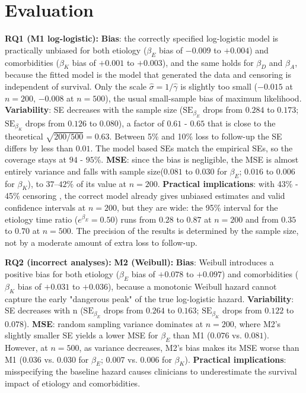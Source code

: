\documentclass[10pt,a4paper]{article}
\begin{document}
\section{Evaluation}
\textbf{RQ1 (M1 log-logistic):}
\textbf{Bias}: the correctly specified log-logistic model is practically unbiased for both etiology ($\beta_E$ bias of $-0.009$ to $+0.004$) and comorbidities ($\beta_K$ bias of $+0.001$ to $+0.003$), and the same holds for $\beta_D$ and $\beta_A$, because the fitted model is the model that generated the data and censoring is independent of survival. Only the scale $\hat\sigma=1/\hat\gamma$ is slightly too small ($-0.015$ at $n=200$, $-0.008$ at $n=500$), the usual small-sample bias of maximum likelihood. \textbf{Variability}: SE decreases with the sample size ($\text{SE}_{\beta_E}$ drops from $0.284$ to $0.173$; $\text{SE}_{\beta_K}$ drops from $0.126$ to $0.080$), a factor of $0.61$ - $0.65$ that is close to the theoretical $\sqrt{200/500}=0.63$. Between 5\% and 10\% loss to follow-up the SE differs by less than $0.01$. The model based SEs match the empirical SEs, so the coverage stays at $94$ - $95$\%. \textbf{MSE}: since the bias is negligible, the MSE is almost entirely variance and falls with sample size($0.081$ to $0.030$ for $\beta_E$; $0.016$ to $0.006$ for $\beta_K$), to $37$--$42\%$ of its value at $n=200$. \textbf{Practical implications}: with 43\% - 45\% censoring , the correct model already gives unbiased estimates and valid confidence intervals at $n = 200$, but they are wide: the 95\% interval for the etiology time ratio ($e^{\beta_E}=0.50$) runs from $0.28$ to $0.87$ at $n=200$ and from $0.35$ to $0.70$ at $n=500$. The precision of the results is determined by the sample size, not by a moderate amount of extra loss to follow-up.

\textbf{RQ2 (incorrect analyses):}
\textbf{M2 (Weibull):} \textbf{Bias}: Weibull introduces a positive bias for both etiology ($\beta_E$ bias of $+0.078$ to $+0.097$) and comorbidities ($\beta_K$ bias of $+0.031$ to $+0.036$), because a monotonic Weibull hazard cannot capture the early "dangerous peak" of the true log-logistic hazard. \textbf{Variability}: SE decreases with n ($\text{SE}_{\beta_E}$ drops from $0.264$ to $0.163$; $\text{SE}_{\beta_K}$ drops from $0.122$ to $0.078$). \textbf{MSE}: random sampling variance dominates at $n=200$, where M2’s slightly smaller SE yields a lower MSE for $\beta_E$ than M1 ($0.076$ vs. $0.081$). However, at $n=500$, as variance decreases, M2’s bias makes its MSE worse than M1 ($0.036$ vs. $0.030$ for $\beta_E$; $0.007$ vs. $0.006$ for $\beta_K$). \textbf{Practical implications}: misspecifying the baseline hazard causes clinicians to underestimate the survival impact of etiology and comorbidities.
\end{document}
